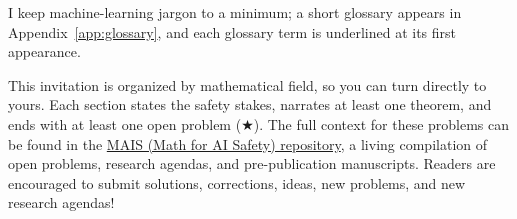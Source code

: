 I keep machine-learning jargon to a minimum; a short glossary appears in Appendix~\ref{app:glossary}, and each glossary term is underlined at its first appearance.

This invitation is organized by mathematical field, so you can turn directly to yours. Each section states the safety stakes, narrates at least one theorem, and ends with at least one open problem (\ensuremath{\bigstar}). The full context for these problems can be found in the \href{https://github.com/lionellevine/MAIS}{MAIS (Math for AI Safety) repository}, a living compilation of open problems, research agendas, and pre-publication manuscripts. Readers are encouraged to submit solutions, corrections, ideas, new problems, and new research agendas!